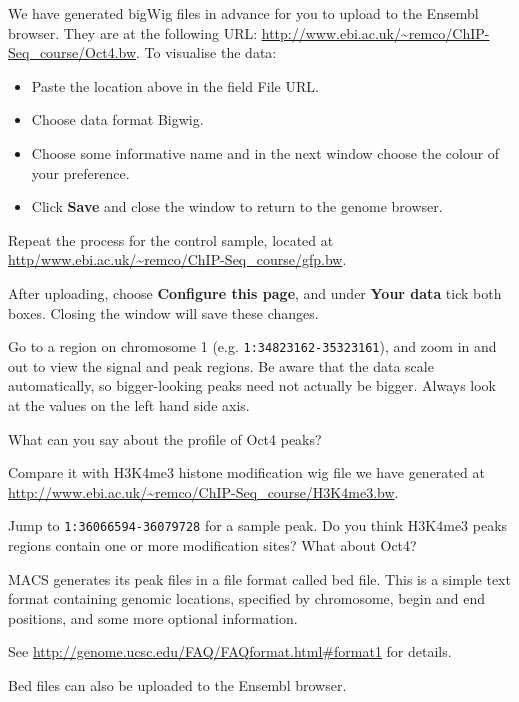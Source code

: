\begin{steps}
We have generated bigWig files in advance for you to upload to the Ensembl
browser. They are at the following URL:
\url{http://www.ebi.ac.uk/~remco/ChIP-Seq_course/Oct4.bw}. To visualise the
data:
\begin{itemize}
	\item Paste the location above in the field File URL. 
	\item Choose data format Bigwig. 
	\item Choose some informative name and in the next window choose the colour of your preference. 
	\item Click \textbf{Save} and close the window to return to the genome browser. 
\end{itemize}
Repeat the process for the control sample, located at
\url{http/www.ebi.ac.uk/~remco/ChIP-Seq_course/gfp.bw}.
 
After uploading, choose \textbf{Configure this page}, and under \textbf{Your
data} tick both boxes. Closing the window will save these changes.

Go to a region on chromosome 1 (e.g. \texttt{1:34823162-35323161}), and zoom in and out
to view the signal and peak regions. Be aware that the data scale automatically,
so bigger-looking peaks need not actually be bigger. Always look at the values
on the left hand side axis.
\end{steps}

\begin{questions}
What can you say about the profile of Oct4 peaks? 
\begin{answer}
\end{answer}

Compare it with H3K4me3 histone modification wig file we have generated at 
\url{http://www.ebi.ac.uk/~remco/ChIP-Seq_course/H3K4me3.bw}. 
\begin{answer}
\end{answer}

Jump to \texttt{1:36066594-36079728} for a sample peak. Do you think H3K4me3
peaks regions contain one or more modification sites? What about Oct4?
\begin{answer}
\end{answer}

\end{questions}

\begin{note}
MACS generates its peak files in a file format called bed file. This is a simple
text format containing genomic locations, specified by chromosome, begin and end
positions, and some more optional information.

See \url{http://genome.ucsc.edu/FAQ/FAQformat.html#format1} for details.

Bed files can also be uploaded to the Ensembl browser.
\end{note}

